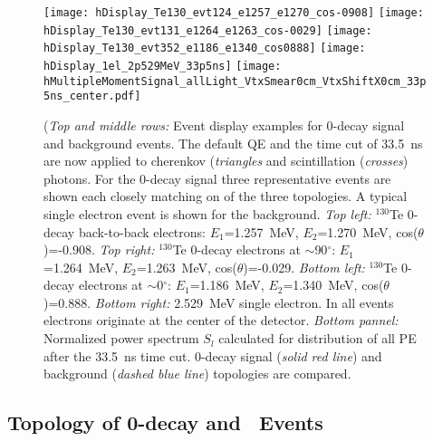 \begin{figure*}[h]
  \centering
  \texttt{[image: hDisplay\_Te130\_evt124\_e1257\_e1270\_cos-0908]}
  \texttt{[image: hDisplay\_Te130\_evt131\_e1264\_e1263\_cos-0029]}
  \texttt{[image: hDisplay\_Te130\_evt352\_e1186\_e1340\_cos0888]}
  \texttt{[image: hDisplay\_1el\_2p529MeV\_33p5ns]}
  \texttt{[image: hMultipleMomentSignal\_allLight\_VtxSmear0cm\_VtxShiftX0cm\_33p5ns\_center.pdf]} 
  \caption{ (\emph{Top and middle rows:} Event display examples for {\Te} 0{\nbb}-decay signal and {\B} background events.
    The default QE and the time cut of 33.5~ns are now applied to cherenkov (\emph{triangles} and scintillation (\emph{crosses}) 
    photons. For the {\Te} 0{\nbb}-decay signal three representative events are shown each closely matching on of the three
    topologies. A typical single electron event is shown for the {\B} background.
    \emph{Top left:} $^{130}$Te 0{\nbb}-decay back-to-back electrons: $E_1$=1.257~MeV, $E_2$=1.270~MeV, 
    cos($\theta$)=-0.908. \emph{Top right:} $^{130}$Te 0{\nbb}-decay electrons at $\sim$90$^{\circ}$: $E_1$=1.264~MeV, $E_2$=1.263~MeV,
    cos($\theta$)=-0.029. \emph{Bottom left:} $^{130}$Te 0{\nbb}-decay electrons at $\sim$0$^{\circ}$: $E_1$=1.186~MeV, $E_2$=1.340~MeV,
    cos($\theta$)=0.888. \emph{Bottom right:} 2.529~MeV single electron. In all events electrons originate at the center of the detector.
    \emph{Bottom pannel:} Normalized power spectrum $S_l$ calculated for distribution of all PE after the 33.5~ns time cut. 
    {\Te} 0{\nbb}-decay signal (\emph{solid red line}) and {\B} background (\emph{dashed blue line}) topologies are compared.}
\label{fig:Te130_Display}
\end{figure*}


\subsection{Topology of 0\nbb-decay and \B~Events}
\label{subsec:topology}




